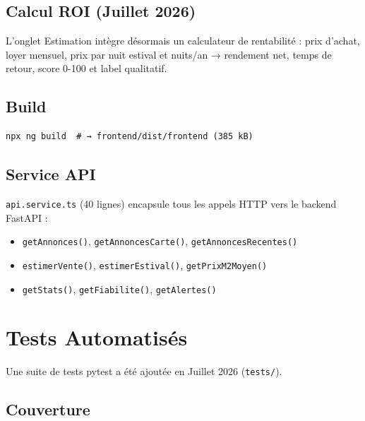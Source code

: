 \documentclass[12pt,a4paper]{report}
\begin{document}
\section{Calcul ROI (Juillet 2026)}

L'onglet Estimation intègre désormais un calculateur de rentabilité : prix d'achat, loyer mensuel, prix par nuit estival et nuits/an → rendement net, temps de retour, score 0-100 et label qualitatif.

\section{Build}
\begin{verbatim}
npx ng build  # → frontend/dist/frontend (385 kB)
\end{verbatim}

\section{Service API}

\texttt{api.service.ts} (40 lignes) encapsule tous les appels HTTP vers le backend FastAPI :
\begin{itemize}
    \item \texttt{getAnnonces()}, \texttt{getAnnoncesCarte()}, \texttt{getAnnoncesRecentes()}
    \item \texttt{estimerVente()}, \texttt{estimerEstival()}, \texttt{getPrixM2Moyen()}
    \item \texttt{getStats()}, \texttt{getFiabilite()}, \texttt{getAlertes()}
\end{itemize}

\chapter{Tests Automatisés}

Une suite de tests pytest a été ajoutée en Juillet 2026 (\texttt{tests/}).

\section{Couverture}
\end{document}
